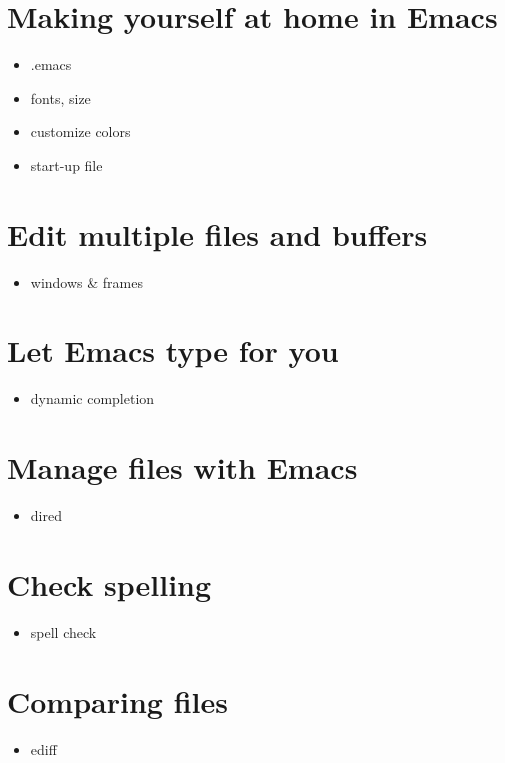 \documentclass{article}
\begin{document}
\section{Making yourself at home in Emacs}
\label{sec-5}

\begin{itemize}
\item .emacs
\item fonts, size
\item customize colors
\item start-up file
\end{itemize}
\section{Edit multiple files and buffers}
\label{sec-6}

\begin{itemize}
\item windows \& frames
\end{itemize}
\section{Let Emacs type for you}
\label{sec-7}

\begin{itemize}
\item dynamic completion
\end{itemize}
\section{Manage files with Emacs}
\label{sec-8}

\begin{itemize}
\item dired
\end{itemize}
\section{Check spelling}
\label{sec-9}

\begin{itemize}
\item spell check
\end{itemize}
\section{Comparing files}
\label{sec-10}

\begin{itemize}
\item ediff
\end{itemize}
\end{document}
